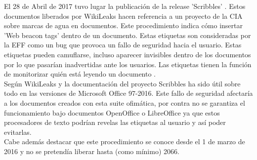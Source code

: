 El 28 de Abril de 2017 tuvo lugar la publicación de la release 'Scribbles' \cite{scribbles}. Estos documentos liberados por WikiLeaks hacen referencia a un proyecto de la CIA sobre marcas de agua en documentos. Este procedimiento indica cómo insertar 'Web beacon tags' dentro de un documento. Estas etiquetas son consideradas por la EFF como un bug que provoca un fallo de seguridad hacia el usuario. Estas etiquetas pueden camuflarse, incluso aparecer invisibles dentro de los documentos por lo que pasarían inadvertidas ante los usuarios. Las etiquetas tienen la función de monitorizar quién está leyendo un documento \cite{web-beacon-tag}. \\
Según WikiLeaks y la documentación del proyecto Scribbles ha sido útil sobre todo en las versiones de Microsoft Office 97-2016. Este fallo de seguridad afectaría a los documentos creados con esta suite ofimática, por contra no se garantiza el funcionamiento bajo documentos OpenOffice o LibreOffice ya que estos procesadores de texto podrían revelas las etiquetas al usuario y así poder evitarlas.\\
Cabe además destacar que este procedimiento se conoce desde el 1 de marzo de 2016 y no se pretendía liberar hasta (como mínimo) 2066.